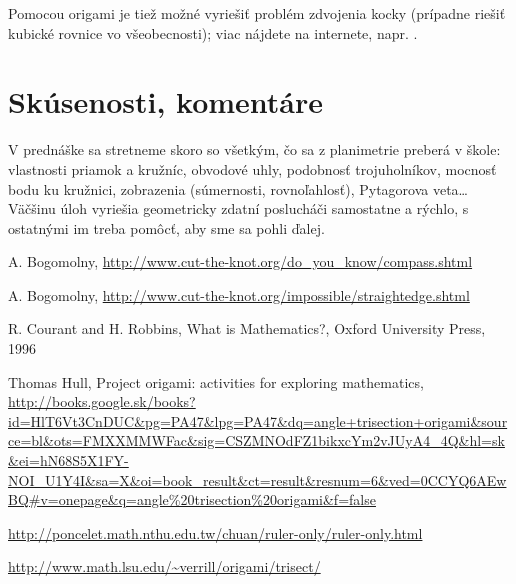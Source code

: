\documentclass[a4paper]{article}
\begin{document}
Pomocou origami je tiež možné vyriešiť problém zdvojenia kocky (prípadne riešiť kubické rovnice vo všeobecnosti);
viac nájdete na internete, napr. \cite{6}.

\section{Skúsenosti, komentáre}

V prednáške sa stretneme skoro so všetkým, čo sa z planimetrie preberá v škole: vlastnosti priamok a kružníc, obvodové uhly, podobnosť trojuholníkov,
mocnosť bodu ku kružnici, zobrazenia (súmernosti, rovnoľahlosť), Pytagorova veta\dots{} Väčšinu úloh vyriešia geometricky zdatní poslucháči samostatne a rýchlo, s ostatnými im treba pomôcť, aby sme sa pohli ďalej.


\begin{thebibliography}{99}

A. Bogomolny, \url{http://www.cut-the-knot.org/do_you_know/compass.shtml}

A. Bogomolny, \url{http://www.cut-the-knot.org/impossible/straightedge.shtml}

R. Courant and H. Robbins, What is Mathematics?, Oxford University Press, 1996

Thomas Hull, Project origami: activities for exploring mathematics, \url{http://books.google.sk/books?id=HlT6Vt3CnDUC&pg=PA47&lpg=PA47&dq=angle+trisection+origami&source=bl&ots=FMXXMMWFac&sig=CSZMNOdFZ1bikxcYm2vJUyA4_4Q&hl=sk&ei=hN68S5X1FY-NOI_U1Y4I&sa=X&oi=book_result&ct=result&resnum=6&ved=0CCYQ6AEwBQ#v=onepage&q=angle%20trisection%20origami&f=false}

\url{http://poncelet.math.nthu.edu.tw/chuan/ruler-only/ruler-only.html}

\url{http://www.math.lsu.edu/~verrill/origami/trisect/}

\end{thebibliography}
\end{document}
